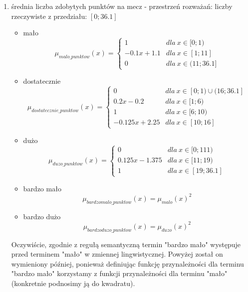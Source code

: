 \documentclass{classrep}
\begin{document}
\begin{enumerate}
    \item średnia liczba zdobytych punktów na mecz - przestrzeń rozważań: liczby rzeczywiste z przedziału: $[0;36.1]$
    \begin{itemize}
        \item mało
        \begin{equation}
            \mu_{malo\_punktow}(x) = \left\{\begin{matrix} 1 & dla \: x\in[0;1) \\ -0.1x + 1.1 & dla \: x\in [1; 11] \\ 0 & dla \: x\in (11;36.1] \end{matrix}\right.
        \end{equation}
         \item dostatecznie
        \begin{equation}
            \mu_{dostatecznie\_punktow}(x) = \left\{\begin{matrix} 0 & dla \: x\in [0;1) \cup (16;36.1]  \\ 0.2x - 0.2 & dla \: x\in[1;6) \\ 1 & dla \: x\in [6; 10) \\ -0.125x + 2.25 & dla \: x\in [10;16] \end{matrix}\right.
        \end{equation}
        \item dużo
        \begin{equation}
            \mu_{duzo\_punktow}(x) = \left\{\begin{matrix}0 & dla \: x\in [0;111) \\ 0.125x - 1.375 & dla \: x\in[11;19) \\ 1 & dla \: x\in [19; 36.1] \end{matrix}\right.
        \end{equation}
        \item bardzo mało
        \begin{equation}
            \mu_{bardzomalo\_punktow}(x) = \mu_{malo}(x)^2
        \end{equation}
        \item bardzo dużo
        \begin{equation}
            \mu_{bardzoduzo\_punktow}(x) = \mu_{duzo}(x)^2
        \end{equation}
    \end{itemize}
    Oczywiście, zgodnie z regułą semantyczną termin "bardzo mało" występuje przed terminem "mało" w zmiennej lingwistycznej. Powyżej został on wymieniony później, ponieważ definiując funkcję przynależności dla terminu "bardzo mało" korzystamy z funkcji przynależności dla terminu "mało" (konkretnie podnosimy ją do kwadratu).

\end{enumerate}
\end{document}
